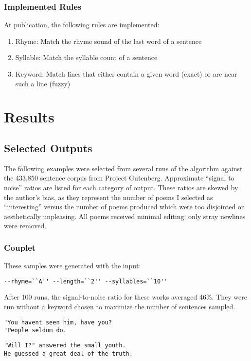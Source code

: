 \documentclass[10pt]{article}
\begin{document}
\subsubsection{Implemented Rules}
At publication, the following rules are implemented:
\singlespacing
\begin{enumerate}
\item Rhyme: Match the rhyme sound of the last word of a sentence
\item Syllable: Match the syllable count of a sentence
\item Keyword: Match lines that either contain a given word (exact) or are near such a line (fuzzy)
\end{enumerate}
\doublespacing

\section{Results}
\subsection{Selected Outputs}
The following examples were selected from several runs of the algorithm against
the 433,850 sentence corpus from Project Gutenberg. Approximate ``signal to
noise'' ratios are listed for each category of output. These ratios are skewed
by the author's bias, as they represent the number of poems I selected as
``interesting'' versus the number of poems produced which were too disjointed or
aesthetically unpleasing. All poems received minimal editing; only stray newlines
were removed.

\subsubsection{Couplet}
These samples were generated with the input:
\begin{verbatim}
--rhyme=``A'' --length=``2'' --syllables=``10''
\end{verbatim}
After 100 runs, the signal-to-noise ratio for these works averaged 46\%. They
were run without a keyword chosen to maximize the number of sentences sampled.
\singlespacing
\begin{verbatim}
"You havent seen him, have you? 
"People seldom do.
\end{verbatim}

\begin{verbatim}
"Will I?" answered the small youth.
He guessed a great deal of the truth.
\end{verbatim}
\end{document}
